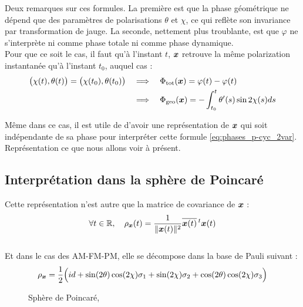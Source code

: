 Deux remarques sur ces formules. 
La première est que la phase géométrique ne dépend que des paramètres de polarisations $\theta$ et $\chi$, ce qui reflète son invariance par transformation de jauge.
La seconde, nettement plus troublante, est que $\varphi$ ne s'interprète ni comme phase totale ni comme phase dynamique. 
\\
Pour que ce soit le cas, il faut qu'à l'instant $t$, $\boldsymbol{x} $ retrouve la même polarization instantanée qu'à l'instant $t_0$, auquel cas :
\begin{equation}\label{eq:phases_p-cyc_2var}
	\begin{aligned}
		\big( \chi(t), \theta(t) \big) = \big( \chi(t_0), \theta(t_0) \big)\quad 
		&\Longrightarrow\quad \Phi_{\text{\normalfont tot}}(\boldsymbol{x} ) = \varphi(t) - \varphi(t) \\
		&\Longrightarrow\quad \Phi_{\text{\normalfont geo}}(\boldsymbol{x} ) = -\int_{t_0}^t \theta'(s) \sin 2\chi(s) ds
	\end{aligned}
\end{equation}
\skipl

Même dans ce cas, il est utile de d'avoir une représentation de $\boldsymbol{x} $ qui soit indépendante de sa phase  pour interpréter cette formule \eqref{eq:phases_p-cyc_2var}. Représentation ce que nous allons voir à présent.
\\



\subsection{Interprétation dans la sphère de Poincaré}\label{subsec:phase_g2Poincare}

Cette représentation n'est autre que la matrice de covariance de $\boldsymbol{x}$ :
\begin{equation} \label{eq:proj2x_2var}
	\forall t\in\mathbb{R},\quad \rho_{\boldsymbol{x}}(t) = \frac{1}{\|\boldsymbol{x}(t) \|^2} \overline{\boldsymbol{x}(t) }\, ^t\boldsymbol{x}(t)
\end{equation}
\\
Et dans le cas des AM-FM-PM, elle se décompose dans la base de Pauli suivant :
\begin{equation} \label{eq:decompo_pauli}
	\rho_{\boldsymbol{x}} = \frac{1}{2}\Big( id + \sin(2\theta) \cos(2\chi) \sigma_1 + \sin (2\chi) \sigma_2 + \cos(2\theta) \cos(2\chi) \sigma_3 \Big)
\end{equation}


\begin{figure}
	
	\caption{Sphère de Poincaré, }
	\label{fig:sphere2poincare}
\end{figure}

